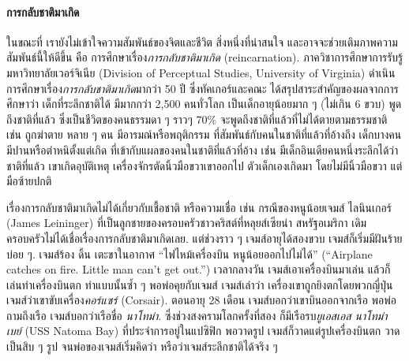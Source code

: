 {\begin{shaded}
		
		\paragraph{\small การกลับชาติมาเกิด}
		ในขณะที่ เรายังไม่เข้าใจความสัมพันธ์ของจิตและชีวิต
		สิ่งหนึ่งที่น่าสนใจ และอาจจะช่วยเติมภาพความสัมพันธ์นี้ให้ดีขึ้น 
		คือ การศึกษาเรื่อง\textit{การกลับชาติมาเกิด} (reincarnation).
		ภาควิชาการศึกษาการรับรู้ มหาวิทยาลัยเวอร์จิเนีย (Division of Perceptual Studies, University of Virginia) ดำเนินการศึกษาเรื่อง\textit{การกลับชาติมาเกิด}มากว่า 50 ปี ซึ่งทัคเกอร์และคณะ\cite{TuckerEtAl2017a} ได้สรุปสาระสำคัญของผลจากการศึกษาว่า
		เด็กที่ระลึกชาติได้
		มีมากกว่า 2,500 คนทั่วโลก
		เป็นเด็กอายุน้อยมาก ๆ (ไม่เกิน 6 ขวบ)
		พูดถึงชาติที่แล้ว ซึ่งเป็นชีวิตของคนธรรมดา ๆ
		ราวๆ 70\%  จะพูดถึงชาติที่แล้วที่ไม่ได้ตายตามธรรมชาติ เช่น ถูกฆ่าตาย
		หลาย ๆ คน มีอารมณ์หรือพฤติกรรม ที่สัมพันธ์กับคนในชาติที่แล้วที่อ้างถึง
		เด็กบางคนมีปานหรือตำหนิตั้งแต่เกิด ที่เข้ากับแผลของคนในชาติที่แล้วที่อ้าง
		เช่น มีเด็กอินเดียคนหนึ่งระลึกได้ว่า ชาติที่แล้ว เขาเกิดอุบัติเหตุ เครื่องจักรตัดนิ้วมือขวาเขาออกไป 
		ตัวเด็กเองเกิดมา โดยไม่มีนิ้วมือขวา แต่มือซ้ายปกติ
		
		เรื่องการกลับชาติมาเกิดไม่ได้เกี่ยวกับเชื้อชาติ หรือความเชื่อ
		เช่น กรณีของหนูน้อยเจมส์ ไลนินเกอร์ (James Leininger)
		ที่เป็นลูกชายของครอบครัวชาวคริสต์ที่หลุยส์เซียน่า สหรัฐอเมริกา
		เดิมครอบครัวไม่ได้เชื่อเรื่องการกลับชาติมาเกิดเลย.
		แต่ช่วงราว ๆ เจมส์อายุได้สองขวบ
		เจมส์ก็เริ่มมีฝันร้ายบ่อย ๆ.
		เจมส์ร้อง ดิ้น เตะขาในอากาศ
		``ไฟไหม้เครื่องบิน หนูน้อยออกไปไม่ได้''
		(``Airplane catches on fire.
		Little man can't get out.'')
		เวลากลางวัน เจมส์เอาเครื่องบินมาเล่น แล้วก็เล่นทำเครื่องบินตก ทำแบบนั้นซ้ำ ๆ
		พอพ่อคุยกับเจมส์ เจมส์เล่าว่า เครื่องเขาถูกยิงตกโดยพวกญี่ปุ่น
		เจมส์ว่าเขาขับเครื่อง\textit{คอร์แซร์} (Corsair).
		ตอนอายุ 28 เดือน เจมส์บอกว่าเขาบินออกจากเรือ
		พอพ่อถามถึงเรือ เจมส์บอกว่าเรือชื่อ \textit{นาโทม่า}.
		ซึ่งช่วงสงครามโลกครั้งที่สอง ก็มีเรือรบ\textit{ยูเอสเอส นาโทม่า เบย์} (USS Natoma Bay) ที่ประจำการอยู่ในแปซิฟิก
		พอวาดรูป เจมส์ก็วาดแต่รูปเครื่องบินตก วาดเป็นสิบ ๆ รูป
		จนพ่อของเจมส์เริ่มคิดว่า หรือว่าเจมส์ระลึกชาติได้จริง ๆ
		

\end{shaded}}
